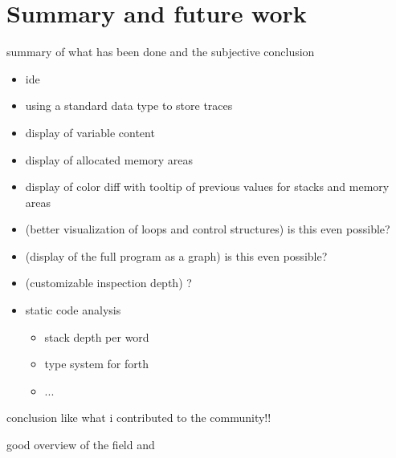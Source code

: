 \chapter{Summary and future work}

summary of what has been done and the subjective conclusion

\begin{itemize}
\item ide
\item using a standard data type to store traces
\item display of variable content
\item display of allocated memory areas
\item display of color diff with tooltip of previous values for stacks and memory areas
\item (better visualization of loops and control structures) is this even possible?
\item (display of the full program as a graph) is this even possible?
\item (customizable inspection depth) ?
\item static code analysis
\begin{itemize}
\item stack depth per word
\item type system for forth
\item ...
\end{itemize}
\end{itemize}


conclusion like what i contributed to the community!!

good overview of the field \cite{Canfora:2011:ACS:1924421.1924451} and \cite{Cornelissen2009}
